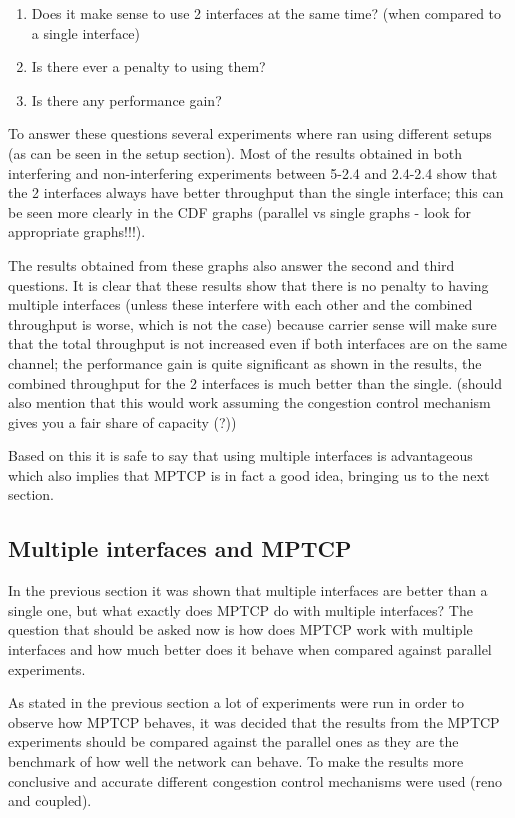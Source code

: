 \documentclass[12pt,a4paper]{article}
\begin{document}
\begin{enumerate}
  \item Does it make sense to use 2 interfaces at the same time? (when compared
    to a single interface)
  \item Is there ever a penalty to using them?
  \item Is there any performance gain?
\end{enumerate}

To answer these questions several experiments where ran using different setups
(as can be seen in the setup section). Most of the results obtained in both
interfering and non-interfering experiments between 5-2.4 and 2.4-2.4 show that
the 2 interfaces always have better throughput than the single interface; this
can be seen more clearly in the CDF graphs (parallel vs single graphs - look for
appropriate graphs!!!).


The results obtained from these graphs also answer the second and third
questions. It is clear that these results show that there is no penalty to
having multiple interfaces (unless these interfere with each other and the
combined throughput is worse, which is not the case) because carrier sense will
make sure that the total throughput is not increased even if both interfaces are
on the same channel; the performance gain is quite significant as shown in the
results, the combined throughput for the 2 interfaces is much better than the
single. (should also mention that this would work assuming the congestion
control mechanism gives you a fair share of capacity (?))

Based on this it is safe to say that using multiple interfaces is advantageous
which also implies that MPTCP is in fact a good idea, bringing us to the next
section.

\subsection{Multiple interfaces and MPTCP}

In the previous section it was shown that multiple interfaces are better than a
single one, but what exactly does MPTCP do with multiple interfaces? The
question that should be asked now is how does MPTCP work with multiple
interfaces and how much better does it behave when compared against parallel
experiments.

As stated in the previous section a lot of experiments were run in order to
observe how MPTCP behaves, it was decided that the results from the MPTCP
experiments should be compared against the parallel ones as they are the
benchmark of how well the network can behave. To make the results more
conclusive and accurate different congestion control mechanisms were used (reno
and coupled).
\end{document}
